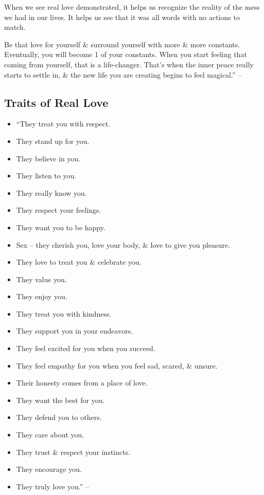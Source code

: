 \documentclass{article}
\numberwithin{equation}{section}
\begin{document}
When we see real love demonstrated, it helps us recognize the reality of the mess we had in our lives. It helps us see that it was all words with no actions to match.

Be that love for yourself \& surround yourself with more \& more constants. Eventually, you will become 1 of your constants. When you start feeling that coming from yourself, that is a life-changer. That's when the inner peace really starts to settle in, \& the new life you are creating begins to feel magical.'' -- \cite[pp. 157--159]{Mirza2017}

\subsection{Traits of Real Love}

\begin{itemize}
	\item ``They treat you with respect.
	\item They stand up for you.
	\item They believe in you.
	\item They listen to you.
	\item They really know you.
	\item They respect your feelings.
	\item They want you to be happy.
	\item Sex -- they cherish you, love your body, \& love to give you pleasure.
	\item They love to treat you \& celebrate you.
	\item They value you.
	\item They enjoy you.
	\item They treat you with kindness.
	\item They support you in your endeavors.
	\item They feel excited for you when you succeed.
	\item They feel empathy for you when you feel sad, scared, \& unsure.
	\item Their honesty comes from a place of love.
	\item They want the best for you.
	\item They defend you to others.
	\item They care about you.
	\item They trust \& respect your instincts.
	\item They encourage you.
	\item They truly love you.'' -- \cite[p. 159]{Mirza2017}
\end{itemize}
\end{document}
